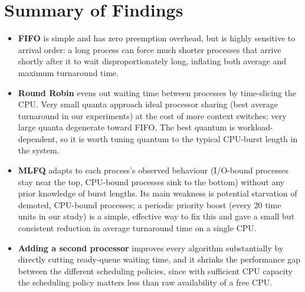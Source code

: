 \documentclass[11pt]{article}
\begin{document}
\section{Summary of Findings}
\begin{itemize}
  \item \textbf{FIFO} is simple and has zero preemption overhead, but is
        highly sensitive to arrival order: a long process can force much
        shorter processes that arrive shortly after it to wait
        disproportionately long, inflating both average and maximum
        turnaround time.
  \item \textbf{Round Robin} evens out waiting time between processes by
        time-slicing the CPU. Very small quanta approach ideal processor
        sharing (best average turnaround in our experiments) at the cost of
        more context switches; very large quanta degenerate toward FIFO.
        The best quantum is workload-dependent, so it is worth tuning quantum
        to the typical CPU-burst length in the system.
  \item \textbf{MLFQ} adapts to each process's observed behaviour (I/O-bound
        processes stay near the top, CPU-bound processes sink to the
        bottom) without any prior knowledge of burst lengths. Its main
        weakness is potential starvation of demoted, CPU-bound processes;
        a periodic priority boost (every 20 time units in our study) is a
        simple, effective way to fix this and gave a small but consistent
        reduction in average turnaround time on a single CPU.
  \item \textbf{Adding a second processor} improves every algorithm
        substantially by directly cutting ready-queue waiting time,
        and it shrinks the performance gap between the different
        scheduling policies, since with sufficient CPU capacity the
        scheduling policy matters less than raw availability of a free
        CPU.
\end{itemize}

\end{document}
